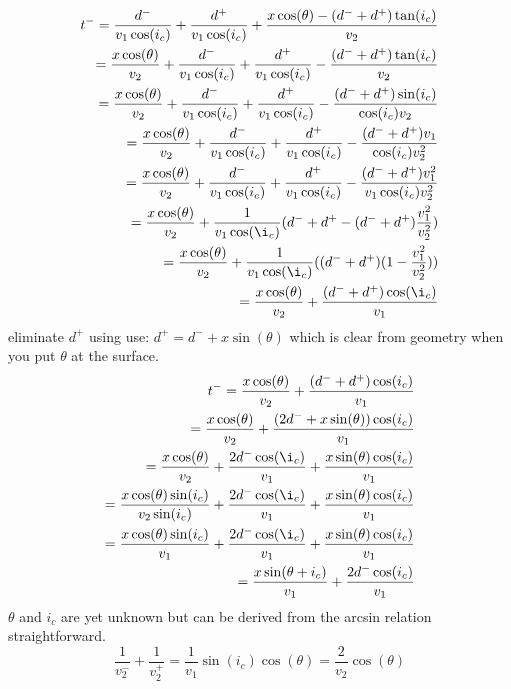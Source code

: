 \documentclass[a4paper,12pt,fleqn]{article}
\begin{document}
\begin{eqnarray*}
  t^- = \frac{d^-}{v_1\cos(i_c)} + \frac{d^+}{v_1\cos(i_c)} + \frac{x\cos(\theta)-(d^-+d^+)\tan(i_c)}{v_2} \\
  = \frac{x\cos(\theta)}{v_2} + \frac{d^-}{v_1\cos(i_c)}  + \frac{d^+}{v_1\cos(i_c)} - \frac{(d^-+d^+)\tan(i_c)}{v_2} \\
  = \frac{x\cos(\theta)}{v_2} + \frac{d^-}{v_1\cos(i_c)}  + \frac{d^+}{v_1\cos(i_c)} - \frac{(d^-+d^+)\sin(i_c)}{\cos(i_c)v_2} \\
  = \frac{x\cos(\theta)}{v_2} + \frac{d^-}{v_1\cos(i_c)}  + \frac{d^+}{v_1\cos(i_c)} - \frac{(d^-+d^+)v_1}{\cos(i_c)v_2^2} \\
  = \frac{x\cos(\theta)}{v_2} + \frac{d^-}{v_1\cos(i_c)}  + \frac{d^+}{v_1\cos(i_c)} - \frac{(d^-+d^+)v_1^2}{v_1\cos(i_c)v_2^2} \\
  = \frac{x\cos(\theta)}{v_2} + \frac{1}{v_1\cos(\i_c)} (d^-+d^+-(d^-+d^+)\frac{v_1^2}{v_2^2}) \\
  = \frac{x\cos(\theta)}{v_2} + \frac{1}{v_1\cos(\i_c)} ((d^-+d^+)(1-\frac{v_1^2}{v_2^2})) \\
  = \frac{x\cos(\theta)}{v_2} + \frac{(d^-+d^+)\cos(\i_c)}{v_1}\\
\end{eqnarray*}
eliminate $d^+$ using use: $d^+ = d^- + x\sin(\theta)$ which is clear from geometry when you put $\theta$ at the surface.
\begin{eqnarray*}
  t^- = \frac{x\cos(\theta)}{v_2} + \frac{(d^-+d^+)\cos(i_c)}{v_1} \\
  = \frac{x\cos(\theta)}{v_2} + \frac{(2d^-+x\sin(\theta))\cos(i_c)}{v_1}\\
  = \frac{x\cos(\theta)}{v_2} + \frac{2d^-\cos(\i_c)}{v_1} +\frac{x\sin(\theta)\cos(i_c)}{v_1}\\
  = \frac{x\cos(\theta)\sin(i_c)}{v_2\sin(i_c)} + \frac{2d^-\cos(\i_c)}{v_1} +\frac{x\sin(\theta)\cos(i_c)}{v_1}\\
  = \frac{x\cos(\theta)\sin(i_c)}{v_1} + \frac{2d^-\cos(\i_c)}{v_1} +\frac{x\sin(\theta)\cos(i_c)}{v_1}\\
  = \frac{x\sin(\theta+i_c)}{v_1} + \frac{2d^-\cos(i_c)}{v_1}\\
\end{eqnarray*}
$\theta$ and $i_c$ are yet unknown but can be derived from the arcsin relation straightforward.
$$
\frac{1}{v_2^-}+\frac{1}{v_2^+} = \frac{1}{v_1}\sin(i_c)\cos(\theta) = \frac{2}{v_2}\cos(\theta)
$$
\end{document}
